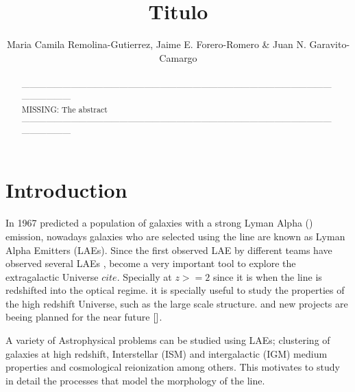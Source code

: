 \documentclass{latex/emulateapj}
\begin{document}
\title{Titulo}


\author{ Maria Camila Remolina-Gutierrez, Jaime E. Forero-Romero \& Juan N. Garavito-Camargo}


\begin{abstract}
\noindent ------------------------------------------------------------------------------------------------------------------------------------\\
MISSING: The abstract\\
------------------------------------------------------------------------------------------------------------------------------------\\
\end{abstract}

\section{Introduction}
\label{sec:intro}

In 1967 \cite{PartridgePeebles} predicted a population of galaxies with a strong 
Lyman Alpha (\lya) emission,  nowadays galaxies who are selected using the \lya 
line are known as Lyman Alpha Emitters (LAEs). Since the first 
observed LAE by \cite{DjorgovskiThompson} different teams have 
observed several LAEs \cite{Kulas12, Ostlin14}  ,  become a very important tool to 
explore the extragalactic Universe $cite{}$.  Specially at $z>=2$ since it is when the 
line is redshifted into the optical regime. it is specially useful to study the 
properties of the high redshift Universe, such as the large scale structure.
and new projects are beeing planned for the near future $\cite{}$.

A variety of Astrophysical problems can be studied using LAEs; clustering
of galaxies at high redshift, Interstellar (ISM) and intergalactic (IGM) medium 
properties and cosmological reionization among others. This motivates to study in 
detail the processes that model the morphology of the \lya line.
\end{document}
